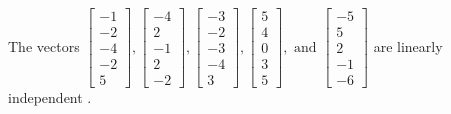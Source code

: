\begin{exercise}
\begin{exerciseStatement}
  \end{exerciseStatement}
  \begin{exerciseAnswer}
   The vectors \(\left[\begin{array}{r}
-1 \\
-2 \\
-4 \\
-2 \\
5
\end{array}\right] , \left[\begin{array}{r}
-4 \\
2 \\
-1 \\
2 \\
-2
\end{array}\right] , \left[\begin{array}{r}
-3 \\
-2 \\
-3 \\
-4 \\
3
\end{array}\right] , \left[\begin{array}{r}
5 \\
4 \\
0 \\
3 \\
5
\end{array}\right] , \text{ and } \left[\begin{array}{r}
-5 \\
5 \\
2 \\
-1 \\
-6
\end{array}\right]\) are 
  	 linearly independent  .
  


  \end{exerciseAnswer}
\end{exercise}
